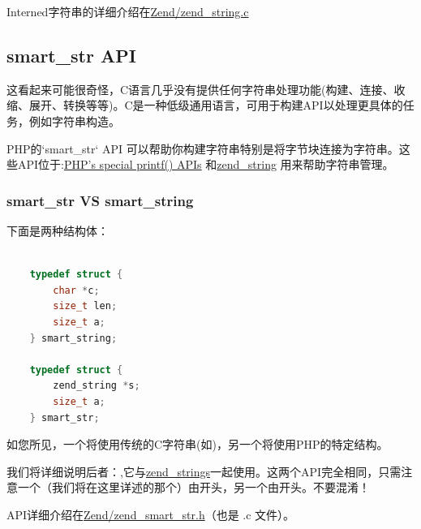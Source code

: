 Interned字符串的详细介绍在\href{https://github.com/php/php-src/blob/PHP-7.0/Zend/zend_string.c}{Zend/zend\_string.c}


\subsection{smart\_str API}

这看起来可能很奇怪，C语言几乎没有提供任何字符串处理功能(构建、连接、收缩、展开、转换等等)。C是一种低级通用语言，可用于构建API以处理更具体的任务，例如字符串构造。


PHP的`smart\_str` API 可以帮助你构建字符串特别是将字节块连接为字符串。这些API位于:\href{http://www.phpinternalsbook.com/php7/internal_types/strings/printing_functions.html}{PHP’s special printf() APIs} 和\href{http://www.phpinternalsbook.com/php7/internal_types/strings/zend_strings.html}{zend\_string} 用来帮助字符串管理。

\subsubsection{smart\_str VS smart\_string}

下面是两种结构体：

\begin{lstlisting}[language=c]

    typedef struct {
        char *c;
        size_t len;
        size_t a;
    } smart_string;

    typedef struct {
        zend_string *s;
        size_t a;
    } smart_str;

\end{lstlisting}


如您所见，一个将使用传统的C字符串(如)，另一个将使用PHP的特定结构。

我们将详细说明后者：,它与\href{http://www.phpinternalsbook.com/php7/internal_types/strings/zend_strings.html}{zend\_strings}一起使用。这两个API完全相同，只需注意一个（我们将在这里详述的那个）由开头，另一个由开头。不要混淆！

 API详细介绍在\href{https://github.com/php/php-src/blob/509f5097ab0b578adc311c720afcea8de266aadd/Zend/zend_smart_str.h}{Zend/zend\_smart\_str.h}（也是 .c 文件）。


